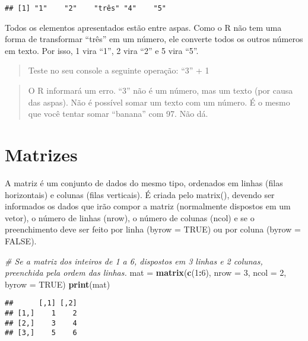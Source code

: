 \documentclass[
]{book}
\newenvironment{Shaded}{\begin{snugshade}}{\end{snugshade}}
\newcommand{\CommentTok}[1]{\textcolor[rgb]{0.56,0.35,0.01}{\textit{#1}}}
\newcommand{\DataTypeTok}[1]{\textcolor[rgb]{0.13,0.29,0.53}{#1}}
\newcommand{\DecValTok}[1]{\textcolor[rgb]{0.00,0.00,0.81}{#1}}
\newcommand{\KeywordTok}[1]{\textcolor[rgb]{0.13,0.29,0.53}{\textbf{#1}}}
\newcommand{\NormalTok}[1]{#1}
\newcommand{\OperatorTok}[1]{\textcolor[rgb]{0.81,0.36,0.00}{\textbf{#1}}}
\newcommand{\OtherTok}[1]{\textcolor[rgb]{0.56,0.35,0.01}{#1}}
\newcommand{\StringTok}[1]{\textcolor[rgb]{0.31,0.60,0.02}{#1}}
\begin{document}
\begin{verbatim}
## [1] "1"    "2"    "três" "4"    "5"
\end{verbatim}

Todos os elementos apresentados estão entre aspas. Como o R não tem uma forma de transformar ``três'' em um número, ele converte todos os outros números em texto. Por isso, 1 vira ``1'', 2 vira ``2'' e 5 vira ``5''.

\begin{quote}
Teste no seu console a seguinte operação: ``3'' + 1
\end{quote}

\begin{quote}
O R informará um erro. ``3'' não é um número, mas um texto (por causa das aspas). Não é possível somar um texto com um número. É o mesmo que você tentar somar ``banana'' com 97. Não dá.
\end{quote}

\hypertarget{matrizes}{%
\section{Matrizes}\label{matrizes}}

A matriz é um conjunto de dados do mesmo tipo, ordenados em linhas (filas horizontais) e colunas (filas verticais). É criada pelo matrix(), devendo ser informados os dados que irão compor a matriz (normalmente dispostos em um vetor), o número de linhas (nrow), o número de colunas (ncol) e se o preenchimento deve ser feito por linha (byrow = TRUE) ou por coluna (byrow = FALSE).

\begin{Shaded}
\begin{Highlighting}[]
\CommentTok{# Se a matriz dos inteiros de 1 a 6, dispostos em 3 linhas e 2 colunas, preenchida pela ordem das linhas.}
\NormalTok{mat =}\StringTok{ }\KeywordTok{matrix}\NormalTok{(}\KeywordTok{c}\NormalTok{(}\DecValTok{1}\OperatorTok{:}\DecValTok{6}\NormalTok{), }\DataTypeTok{nrow =} \DecValTok{3}\NormalTok{, }\DataTypeTok{ncol =} \DecValTok{2}\NormalTok{, }\DataTypeTok{byrow =} \OtherTok{TRUE}\NormalTok{)}
\KeywordTok{print}\NormalTok{(mat)}
\end{Highlighting}
\end{Shaded}

\begin{verbatim}
##      [,1] [,2]
## [1,]    1    2
## [2,]    3    4
## [3,]    5    6
\end{verbatim}
\end{document}
